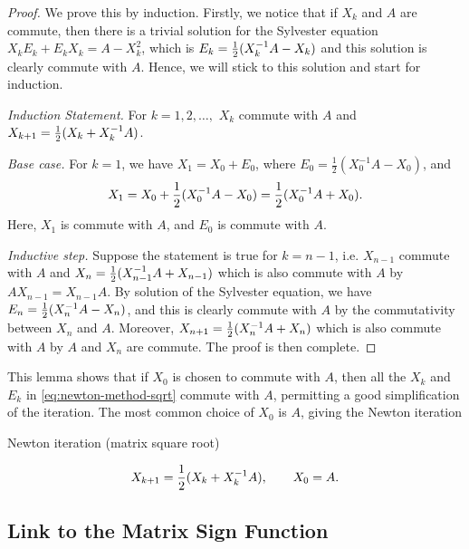 \documentclass{article}
\begin{document}
\begin{proof}
  We prove this by induction. Firstly, we notice that if $X_k$ and $A$ are
  commute, then  there is a trivial solution for the Sylvester equation
  $X_kE_k + E_k X_k = A - X_k^2$, which is $E_k = \frac{1}{2}(X_k^{-1} A -
  X_k)$ and this solution is clearly commute with $A$. Hence, we will stick
  to this solution and start for induction.

  \noindent\emph{Induction Statement.} For $k = 1,2,\dots,$ $X_k$ commute
  with $A$ and $X_{k + 1} = \frac{1}{2}(X_k + X_k^{-1} A)$.

  \noindent\emph{Base case.} For $k = 1$, we have $X_1 = X_0 + E_0$, where
  $E_0 = \frac{1}{2}(X_0^{-1} A - X_0)$, and  
  \begin{equation}\notag
    X_1 = X_0 + \frac{1}{2}(X_0^{-1} A - X_0) = \frac{1}{2}(X_0^{-1} A + X_0).
  \end{equation}
  Here, $X_1$ is commute with $A$, and $E_0$ is commute with $A$. 

  \noindent\emph{Inductive step.} Suppose the statement is true for $k =
  n-1$, i.e. $X_{n-1}$ commute with $A$ and $X_n = \frac{1}{2}( X_{n-1}
  ^{-1} A + X_{n-1})$ which is also commute with $A$ by $AX_{n -1} =
  X_{n-1}A$.  By solution of the  Sylvester equation, we have $E_n =
  \frac{1}{2}(X_n^{-1} A - X_n)$, and this is clearly commute with $A$ by
  the commutativity between $X_n$ and $A$. Moreover, $X_{n + 1} =
  \frac{1}{2}(X_n^{-1} A + X_{n})$ which is also commute with $A$ by $A$ and
  $X_n$ are commute. The proof is then complete.
\end{proof}

This lemma shows that if $X_0$ is chosen to commute with $A$, then all the
$X_k$ and $E_{k}$ in \eqref{eq:newton-method-sqrt} commute with $A$,
permitting a good simplification of the iteration. The most common choice
of $X_0$ is $A$, giving the Newton iteration 
\begin{mybox}{}
  \begin{center}
    \textsf{Newton iteration (matrix square root)}
  \end{center}
  \begin{equation}\label{eq:6.12}
    X_{k + 1} = \frac{1}{2}(X_k + X_k^{-1} A), \qquad X_0 = A.
  \end{equation}
\end{mybox}

\subsection{Link to the Matrix Sign Function}
\end{document}
